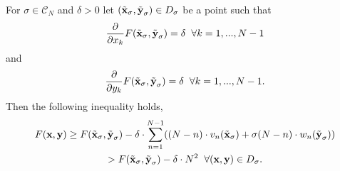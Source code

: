 \begin{Th}
    For $\sigma\in \mathcal{C}_N$ and $\delta > 0$ let $(\Tilde{\textbf{x}}_{\sigma},\Tilde{\textbf{y}}_{\sigma}) \in D_{\sigma}$ be a point such that
    \begin{equation} \label{uno}
        \frac{\partial}{\partial x_k}F(\Tilde{\textbf{x}}_{\sigma},\Tilde{\textbf{y}}_{\sigma}) = \delta \hspace{2mm} \forall k = 1,...,N-1
    \end{equation}
    and
    \begin{equation} \label{dos}
        \frac{\partial}{\partial y_k}F(\Tilde{\textbf{x}}_{\sigma},\Tilde{\textbf{y}}_{\sigma}) = \delta \hspace{2mm} \forall k = 1,...,N-1.
    \end{equation}
    Then the following inequality holds,
    \begin{multline} \label{Wolf}
        F(\textbf{x},\textbf{y}) \geq F(\Tilde{\textbf{x}}_{\sigma},\Tilde{\textbf{y}}_{\sigma}) - \delta \cdot \sum_{n=1}^{N-1} ((N-n)\cdot v_n(\Tilde{\textbf{x}}_{\sigma}) + \sigma (N-n) \cdot w_n(\Tilde{\textbf{y}}_{\sigma})) \\
        > F(\Tilde{\textbf{x}}_{\sigma},\Tilde{\textbf{y}}_{\sigma}) - \delta \cdot N^2 \hspace{2mm} \forall (\textbf{x},\textbf{y})\in D_{\sigma}.
    \end{multline}
\end{Th}

